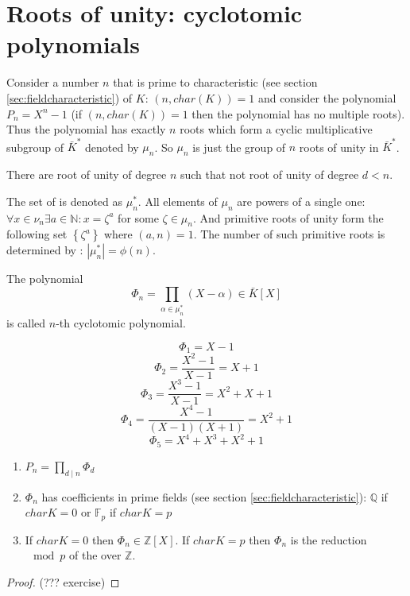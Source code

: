 \section{ Roots of unity: cyclotomic polynomials}
Consider a number $n$ that is prime to characteristic (see section
\ref{sec:fieldcharacteristic}) of $K$:
$\left(n, char\left(K\right)\right) = 1$ and consider the polynomial
$P_n = X^n - 1$ (if $\left(n, char\left(K\right)\right) = 1$ then the
polynomial has no multiple roots). Thus the polynomial has exactly $n$
roots which form a cyclic multiplicative subgroup of $\bar{K}^*$
denoted by $\mu_n$. So $\mu_n$ is just the group of $n$ roots of unity
in $\bar{K}^*$.

\begin{definition}
  There are root of unity of degree $n$ such that not root of unity of
  degree $d < n$.
  \label{def:primitiverootsofunity}
\end{definition}

The set of  is denoted as
$\mu_n^*$. All elements of $\mu_n$ are powers of a single one:
$\forall x \in \nu_n \exists a \in \mathbb{N}: x = \zeta^a$ for some
$\zeta \in \mu_n$. And primitive roots of unity form the following set
$\left\{\zeta^a\right\}$ where $\left(a, n\right) = 1$. The number of
such primitive roots is determined by :
$\left|\mu_n^*\right| = \phi\left(n\right)$.

\begin{definition}
  The polynomial
  \[
  \Phi_n = \prod_{\alpha \in \mu_n^*}\left(X - \alpha\right) \in \bar{K}\left[X\right]
  \]
  is called $n$-th cyclotomic polynomial.
  \label{def:cyclotomicpolynomial}
\end{definition}

\begin{example}
  \[
  \Phi_1 = X - 1
  \]
  \[
  \Phi_2 = \frac{X^2 - 1}{X-1} = X + 1
  \]
  \[
  \Phi_3 = \frac{X^3 - 1}{X-1} = X^2 + X + 1
  \]
  \[
  \Phi_4 = \frac{X^4 - 1}{\left(X-1\right)\left(X + 1\right)} = X^2 + 1
  \]
  \[
  \Phi_5 = X^4 + X^3 + X^2 + 1
  \]  
\end{example}

\begin{proposition}
  \begin{enumerate}
    \item 
      \(
      P_n = \prod_{d \mid n} \Phi_d
      \)
    \item $\Phi_n$ has coefficients in prime fields (see section
      \ref{sec:fieldcharacteristic}): $\mathbb{Q}$ if $char K = 0$ or
      $\mathbb{F}_p$ if $char K = p$
    \item If $char K = 0$ then $\Phi_n \in
      \mathbb{Z}\left[X\right]$. If $char K = p$ then $\Phi_n$ is the
      reduction $\mod{p}$ of the 
      over $\mathbb{Z}$.
  \end{enumerate}
  \begin{proof}
    (??? exercise)
  \end{proof}
\end{proposition}

